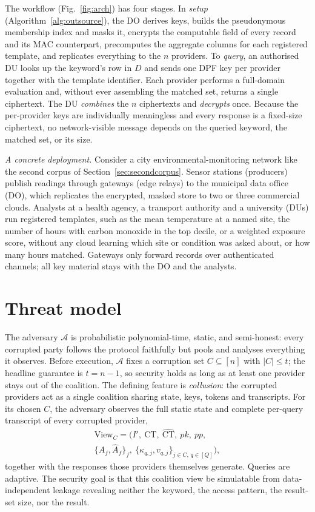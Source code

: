 \documentclass[a4paper,fleqn]{cas-dc}
\newcommand{\Adv}{\mathcal{A}}
\begin{document}
The workflow (Fig.~\ref{fig:arch}) has four stages. In \emph{setup}
(Algorithm~\ref{alg:outsource}), the DO derives keys, builds the pseudonymous
membership index and masks it, encrypts the computable field of every record
and its MAC counterpart, precomputes the aggregate columns for each
registered template, and replicates everything to the $n$ providers. To
\emph{query}, an authorised DU looks up the keyword's row in $D$ and sends one
DPF key per provider together with the template identifier. Each provider
performs a full-domain evaluation and, without ever assembling the matched
set, returns a single ciphertext. The DU \emph{combines} the $n$ ciphertexts
and \emph{decrypts} once. Because the per-provider keys are individually
meaningless and every response is a fixed-size ciphertext, no
network-visible message depends on the queried keyword, the matched set, or
its size.

\emph{A concrete deployment.} Consider a city environmental-monitoring network
like the second corpus of Section~\ref{sec:secondcorpus}. Sensor stations
(producers) publish readings through gateways (edge relays) to the municipal
data office (DO), which replicates the encrypted, masked store to two or three
commercial clouds. Analysts at a health agency, a transport authority and a
university (DUs) run registered templates, such as the mean temperature at a
named site, the number of hours with carbon monoxide in the top decile, or a
weighted exposure score, without any cloud learning which site or condition
was asked about, or how many hours matched. Gateways only forward records over
authenticated channels; all key material stays with the DO and the analysts.

\section{Threat model}
\label{sec:threat}

The adversary $\Adv$ is probabilistic polynomial-time, static, and
semi-honest: every corrupted party follows the protocol faithfully but pools
and analyses everything it observes. Before execution, $\Adv$ fixes a
corruption set $C\subseteq[n]$ with $|C|\le t$; the headline guarantee is
$t=n-1$, so security holds as long as at least one provider stays out of the
coalition. The defining feature is \emph{collusion}: the corrupted providers
act as a single coalition sharing state, keys, tokens and transcripts. For its
chosen $C$, the adversary observes the full static state and complete
per-query transcript of every corrupted provider,
\begin{multline*}
\mathrm{View}_C = \big( I',\ \text{CT},\ \widehat{\text{CT}},\ pk,\ pp,\\
\{A_f,\widehat{A}_f\}_f,\
\{\kappa_{q,j},v_{q,j}\}_{j\in C,\,q\in[Q]} \big),
\end{multline*}
together with the responses those providers themselves generate. Queries are
adaptive. The security goal is that this coalition view be simulatable from
data-independent leakage revealing neither the keyword, the access pattern,
the result-set size, nor the result.
\end{document}
